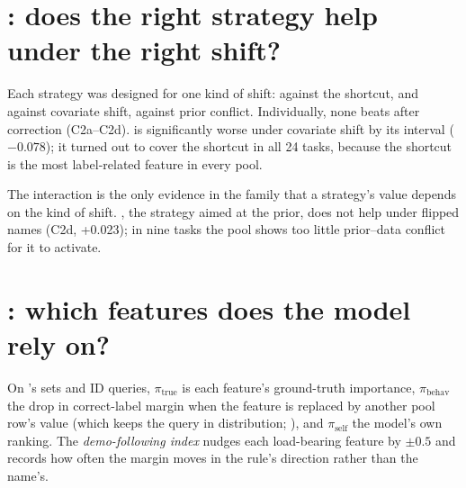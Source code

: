 
\section{: does the right strategy help under the right shift?}
\label{sec:shift-rq2}

Each strategy was designed for one kind of shift:  against the shortcut,  and  against covariate shift,  against prior conflict.
Individually, none beats  after correction (C2a--C2d).
 is significantly worse under covariate shift by its interval ($-0.078$); it turned out to cover the shortcut in all 24 tasks, because the shortcut is the most label-related feature in every pool.


The interaction is the only evidence in the family that a strategy's value depends on the kind of shift.
, the strategy aimed at the prior, does not help under flipped names (C2d, +0.023); in nine tasks the pool shows too little prior--data conflict for it to activate.

\section{: which features does the model rely on?}
\label{sec:shift-rq3}

On 's sets and ID queries, $\pi_{\mathrm{true}}$ is each feature's ground-truth importance, $\pi_{\mathrm{behav}}$ the drop in correct-label margin when the feature is replaced by another pool row's value (which keeps the query in distribution; \citealp{andridge2010review,zhu2026faithfulness}), and $\pi_{\mathrm{self}}$ the model's own ranking.
The \emph{demo-following index} nudges each load-bearing feature by $\pm 0.5$ and records how often the margin moves in the rule's direction rather than the name's.


